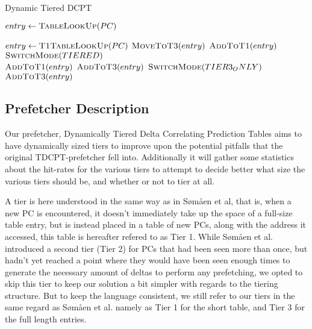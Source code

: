 \begin{algorithm}
\footnotesize
\caption{Dynamic Tiered DCPT \cite{Grannaes481837}}
  \begin{algorithmic}[1]
      \State $entry \gets \Call{TableLookUp}{PC}$

          \State $entry \gets \Call{T1TableLookUp}{PC}$
            \State $\Call{MoveToT3}{entry}$
          \Else
	    \State $\Call{AddToT1}{entry}$ 
          \EndIf
        \Else
            \State $\Call{SwitchMode}{TIERED}$ \\
	    \State $\Call{AddToT1}{entry}$
          \Else
	    \State $\Call{AddToT3}{entry}$
          \EndIf
        \EndIf
	  \State $\Call{SwitchMode}{TIER3_ONLY}$
	\EndIf
	\State $\Call{AddToT3}{entry}$
      \EndIf
    \EndProcedure
  \end{algorithmic}
  \label{alg:dcpt_dyn_tier}
\end{algorithm}


\subsection{Prefetcher Description}

Our prefetcher, Dynamically Tiered Delta Correlating Prediction
Tables aims to have dynamically sized tiers to improve upon the potential
pitfalls that the original TDCPT-prefetcher fell into. Additionally it will
gather some statistics about the hit-rates for the various tiers to attempt to
decide better what size the various tiers should be, and whether or not to tier
at all.

A tier is here understood in the same way as in Sømåen et al, that is, when
a new PC is encountered, it doesn't immediately take up the space of a full-size
table entry, but is instead placed in a table of new PCs, along with the address it
accessed, this table is hereafter refered to as Tier 1. While Sømåen et al. introduced
a second tier (Tier 2) for PCs that had been seen more than once, but hadn't yet
reached a point where they would have been seen enough times to generate the necessary
amount of deltas to perform any prefetching, we opted to skip this tier to keep our
solution a bit simpler with regards to the tiering structure. But to keep the language
consistent, we still refer to our tiers in the same regard as Sømåen et al. namely as Tier 1
for the short table, and Tier 3 for the full length entries.


